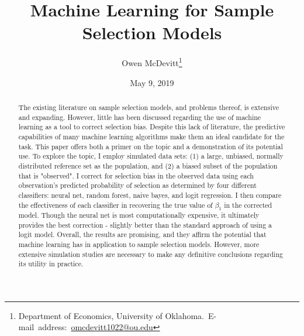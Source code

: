 \documentclass[12pt,english]{article}
\begin{document}
\begin{singlespace}
\title{Machine Learning for Sample Selection Models}
\end{singlespace}

\author{Owen McDevitt\thanks{Department of Economics, University of Oklahoma.\
E-mail~address:~\href{mailto:omcdevitt1022@ou.edu}{omcdevitt1022@ou.edu}}}

\date{May 9, 2019}

\maketitle

\begin{abstract}
The existing literature on sample selection models, and problems thereof, is extensive and expanding. However, little has been discussed regarding the use of machine learning as a tool to correct selection bias. Despite this lack of literature, the predictive capabilities of many machine learning algorithms make them an ideal candidate for the task. This paper offers both a primer on the topic and a demonstration of its potential use. To explore the topic, I employ simulated data sets: (1) a large, unbiased, normally distributed reference set as the population, and (2) a biased subset of the population that is "observed". I correct for selection bias in the observed data using each observation's predicted probability of selection as determined by four different classifiers: neural net, random forest, naive bayes, and logit regression. I then compare the effectiveness of each classifier in recovering the true value of $\beta_1$ in the corrected model. Though the neural net is most computationally expensive, it ultimately provides the best correction - slightly better than the standard approach of using a logit model. Overall, the results are promising, and they affirm the potential that machine learning has in application to sample selection models. However, more extensive simulation studies are necessary to make any definitive conclusions regarding its utility in practice.
\end{abstract}
\end{document}
